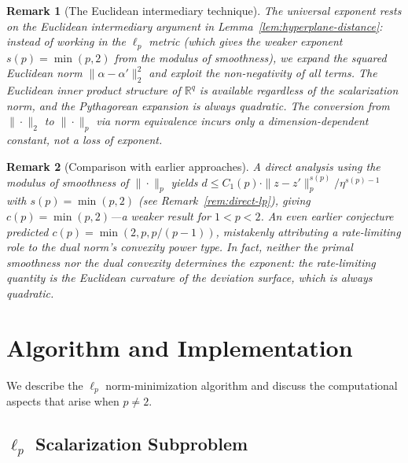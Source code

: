 \documentclass[11pt]{article}
\newtheorem{remark}{Remark}
\newcommand{\R}{\mathbb{R}}
\begin{document}
\begin{remark}[The Euclidean intermediary technique]\label{rem:euclidean-intermediary}
The universal exponent rests on the \emph{Euclidean intermediary} argument in Lemma~\ref{lem:hyperplane-distance}: instead of working in the $\ell_p$ metric (which gives the weaker exponent $s(p) = \min(p,2)$ from the modulus of smoothness), we expand the squared Euclidean norm $\|\alpha - \alpha'\|_2^2$ and exploit the non-negativity of all terms. The Euclidean inner product structure of $\R^q$ is available regardless of the scalarization norm, and the Pythagorean expansion is always quadratic. The conversion from $\|\cdot\|_2$ to $\|\cdot\|_p$ via norm equivalence incurs only a dimension-dependent constant, not a loss of exponent.
\end{remark}

\begin{remark}[Comparison with earlier approaches]\label{rem:old-conjecture}
A direct analysis using the modulus of smoothness of $\|\cdot\|_p$ yields $d \le C_1(p) \cdot \|z - z'\|_p^{s(p)} / \eta^{s(p)-1}$ with $s(p) = \min(p,2)$ (see Remark~\ref{rem:direct-lp}), giving $c(p) = \min(p,2)$---a weaker result for $1 < p < 2$. An even earlier conjecture predicted $c(p) = \min(2, p, p/(p-1))$, mistakenly attributing a rate-limiting role to the dual norm's convexity power type. In fact, neither the primal smoothness nor the dual convexity determines the exponent: the rate-limiting quantity is the Euclidean curvature of the deviation surface, which is always quadratic.
\end{remark}

\section{Algorithm and Implementation}\label{sec:algorithm}

We describe the $\ell_p$ norm-minimization algorithm and discuss the computational aspects that arise when $p \neq 2$.

\subsection{$\ell_p$ Scalarization Subproblem}\label{sec:subproblem}
\end{document}
